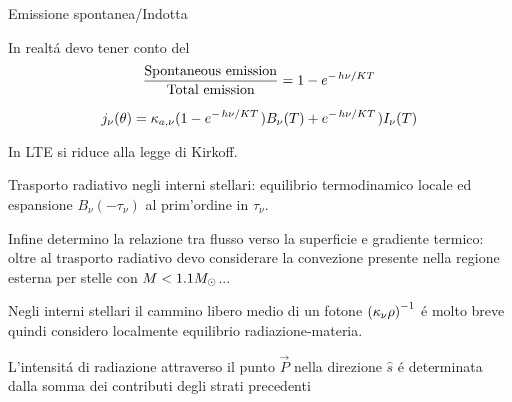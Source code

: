 \documentclass[10pt,xcolor={usenames},fleqn,mathserif,serif]{beamer}
\begin{document}
\begin{wordonframe}{Emissione spontanea/Indotta}

In realt\'a devo tener conto del\[\frac{\text{Spontaneous emission}}{\text{Total emission}}=1-e^{-\left.{h\nu}\middle/{KT}\right.}\]

\[j_{\nu}(\theta)=\kappa_{a,\nu}(1-e^{-\left.{h\nu}\middle/{KT}\right.})B_{\nu}(T)+e^{-\left.{h\nu}\middle/{KT}\right.})I_{\nu}(T)\]

In LTE si riduce alla legge di Kirkoff.

\end{wordonframe}

\begin{wordonframe}{Trasporto radiativo negli interni stellari: equilibrio termodinamico locale ed espansione $B_{\nu}(-\tau_{\nu})$ al prim'ordine in $\tau_{\nu}$.}

{\small

Infine determino la relazione tra flusso verso la superficie e gradiente termico: oltre al trasporto radiativo devo considerare la convezione presente nella regione esterna per stelle con $M<1.1M_{\odot}{}$...

Negli interni stellari il cammino libero medio di un fotone ${(\kappa_{\nu}\rho)}^{-1}$ \'e molto breve quindi considero localmente equilibrio radiazione-materia.

L'intensit\'a di radiazione attraverso il punto $\vec{P}$ nella direzione $\hat{s}$ \'e determinata dalla somma dei contributi degli strati precedenti 





}
\end{wordonframe}
\end{document}
